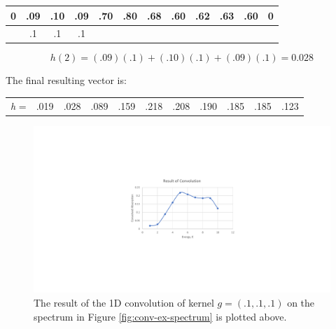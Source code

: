 \begin{table}[h!]
    \centering
    \begin{tabular}{|c|c|c|c|c|c|c|c|c|c|c|c|}
    \hline
    0 & .09 & .10 & .09 & .70 & \multicolumn{1}{c|}{.80} & \multicolumn{1}{c|}{.68} & \multicolumn{1}{c|}{.60} & .62 & .63 & .60 & 0 \\ \hline
      & .1  & .1  & .1  &     &                          &                          &                          &     &     &     &   \\ \hline
    \end{tabular}
\end{table}

$$ 
h(2) = (.09)(.1) + (.10)(.1) + (.09)(.1) = 0.028
$$

\noindent The final resulting vector is:

\begin{table}[h!]
    \centering
    \begin{tabular}{c|c|c|c|c|c|c|c|c|c|c|}
    \cline{2-11}
    \textit{h} = & .019 & .028 & .089 & .159 & .218 & .208 & .190 & .185 & .185 & .123 \\ \cline{2-11} 
    \end{tabular}
\end{table}

\begin{figure}[h!]
    \label{fig:conv-res-spectrum}
    \centering
    \includegraphics[width=.75\linewidth]{Chapters/Figures/conv-example-res.pdf}
    \caption[1D Convolution Result]{The result of the 1D convolution of kernel $ g = (.1, .1, .1) $  on the spectrum in Figure \ref{fig:conv-ex-spectrum} is plotted above.}
\end{figure}

